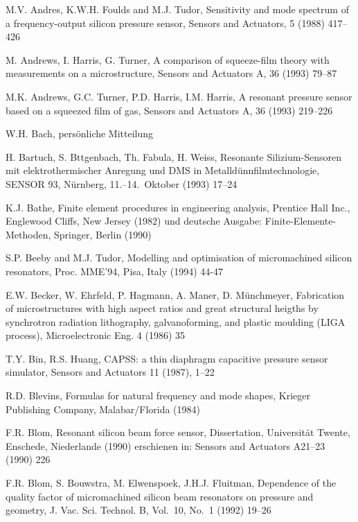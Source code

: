 \begin{thebibliography}{xxx}
 M.V. Andres, K.W.H. Foulds and M.J. Tudor,
 Sensitivity and mode spectrum of a frequency-output silicon pressure sensor,
 Sensors and Actuators, 5 (1988) 417--426

 M. Andrews, I. Harris, G. Turner, A comparison of squeeze-film theory with
 measurements on a microstructure, Sensors and Actuators A, 36 (1993) 79--87

 M.K. Andrews, G.C. Turner, P.D. Harris, I.M. Harris, A resonant pressure
 sensor based on a squeezed film of gas, Sensors and Actuators A, 36 (1993)
 219--226

 W.H. Bach, persönliche Mitteilung

 H. Bartuch, S. Bttgenbach, Th. Fabula, H. Weiss,
 Resonante Silizium-Sensoren mit elektrothermischer Anregung und DMS in
 Metalldünnfilmtechnologie, SENSOR 93, Nürnberg, 11.--14.~Oktober (1993)
 17--24

 K.J. Bathe, Finite element procedures in engineering analysis, Prentice Hall
 Inc., Englewood Cliffs, New Jersey (1982) und deutsche Ausgabe:
 Finite-Elemente-Methoden, Springer, Berlin (1990)

 S.P. Beeby and M.J. Tudor, Modelling and optimisation of micromachined
 silicon resonators, Proc. MME'94, Pisa, Italy (1994) 44-47

 E.W. Becker, W. Ehrfeld, P. Hagmann, A. Maner, D. Münchmeyer, Fabrication of
 microstructures with high aspect ratios and great structural heigths by
 synchrotron radiation lithography, galvanoforming, and plastic moulding
 (LIGA process), Microelectronic Eng. 4 (1986) 35

 T.Y. Bin, R.S. Huang, {\sf CAPSS}: a thin diaphragm capacitive pressure
 sensor simulator, Sensors and Actuators 11 (1987), 1--22

 R.D. Blevins, Formulas for natural frequency and mode shapes,
 Krieger Publishing Company, Malabar/Florida (1984)

 F.R. Blom, Resonant silicon beam force sensor, Dissertation,
 Universität Twente, Enschede, Niederlande (1990)
 erschienen in: Sensors and Actuators A21--23 (1990) 226

 F.R. Blom, S. Bouwstra, M. Elwenspoek, J.H.J. Fluitman, Dependence of the
 quality factor of micromachined silicon beam resonators on pressure and
 geometry, J. Vac. Sci. Technol. B, Vol.~10, No.~1 (1992) 19--26


\end{thebibliography}
